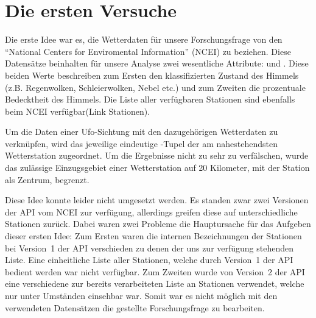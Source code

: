\section{Die ersten Versuche} \label{versuch1}
Die erste Idee war es, die Wetterdaten für unsere Forschungsfrage von den \enquote{National Centers for Enviromental Information} (NCEI) zu beziehen. Diese Datensätze beinhalten für unsere Analyse zwei wesentliche Attribute:  und . Diese beiden Werte beschreiben zum Ersten den klassifizierten Zustand des Himmels (z.B. Regenwolken, Schleierwolken, Nebel etc.) und zum Zweiten die prozentuale Bedecktheit des Himmels. Die Liste aller verfügbaren Stationen sind ebenfalls beim NCEI verfügbar(Link Stationen).

Um die Daten einer Ufo-Sichtung mit den dazugehörigen Wetterdaten zu verknüpfen, wird das jeweilige eindeutige -Tupel der am nahestehendsten Wetterstation zugeordnet. Um die Ergebnisse nicht zu sehr zu verfälschen, wurde das zulässige Einzugsgebiet einer Wetterstation auf 20 Kilometer, mit der Station als Zentrum, begrenzt.

Diese Idee konnte leider nicht umgesetzt werden. Es standen zwar zwei Versionen der API vom NCEI zur verfügung, allerdings greifen diese auf unterschiedliche Stationen zurück. Dabei waren zwei Probleme die Hauptursache für das Aufgeben dieser ersten Idee: Zum Ersten waren die internen Bezeichnungen der Stationen bei Version~1 der API verschieden zu denen der uns zur verfügung stehenden Liste. Eine einheitliche Liste aller Stationen, welche durch Version~1 der API bedient werden war nicht verfügbar. Zum Zweiten wurde von Version~2 der API eine verschiedene zur bereits verarbeiteten Liste an Stationen verwendet, welche nur unter Umständen einsehbar war. Somit war es nicht möglich mit den verwendeten Datensätzen die gestellte Forschungsfrage zu bearbeiten.